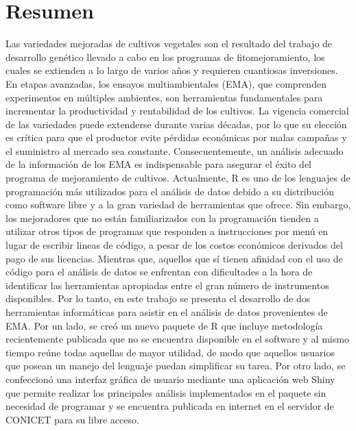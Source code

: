 
\chapter*{Resumen}

Las variedades mejoradas de cultivos vegetales son el resultado del trabajo de desarrollo genético llevado a cabo en los programas de fitomejoramiento, los cuales se extienden a lo largo de varios años y requieren cuantiosas inversiones. En etapas avanzadas, los ensayos multiambientales (EMA), que comprenden experimentos en múltiples ambientes, son herramientas fundamentales para incrementar la productividad y rentabilidad de los cultivos. La vigencia comercial de las variedades puede extenderse durante varias décadas, por lo que su elección es crítica para que el productor evite pérdidas económicas por malas campañas y el suministro al mercado sea constante. Consecuentemente, un análisis adecuado de la información de los EMA es indispensable para asegurar el éxito del programa de mejoramiento de cultivos. Actualmente, R es uno de los lenguajes de programación más utilizados para el análisis de datos debido a su distribución como software libre y a la gran variedad de herramientas que ofrece. Sin embargo, los mejoradores que no están familiarizados con la programación tienden a utilizar otros tipos de programas que responden a instrucciones por menú en lugar de escribir lineas de código, a pesar de los costos económicos derivados del pago de sus licencias. Mientras que, aquellos que sí tienen afinidad con el uso de código para el análisis de datos se enfrentan con dificultades a la hora de identificar las herramientas apropiadas entre el gran número de instrumentos disponibles. Por lo tanto, en este trabajo se presenta el desarrollo de dos herramientas informáticas para asistir en el análisis de datos provenientes de EMA. Por un lado, se creó un nuevo paquete de R que incluye metodología recientemente publicada que no se encuentra disponible en el software y al mismo tiempo reúne todas aquellas de mayor utilidad, de modo que aquellos usuarios que posean un manejo del lenguaje puedan simplificar su tarea. Por otro lado, se confeccionó una interfaz gráfica de usuario mediante una aplicación web Shiny que permite realizar los principales análisis implementados en el paquete sin necesidad de programar y se encuentra publicada en internet en el servidor de CONICET para su libre acceso.

